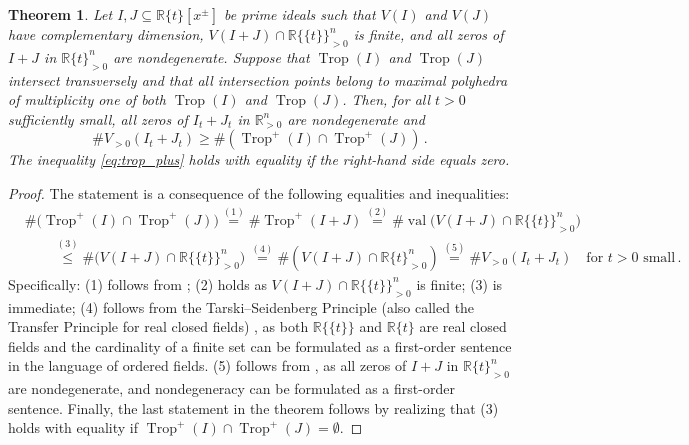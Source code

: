 \documentclass[11pt,reqno,a4paper]{amsart}
\numberwithin{equation}{section}
\theoremstyle{theoremstyle}
\newtheorem{theorem}{Theorem}[section]
\theoremstyle{examplestyle}
\newcommand{\RR}{\mathbb{R}}
\newcommand{\RRt}{\mathbb{R}\{\!\{t\}\!\}}
\DeclareMathOperator{\Trop}{Trop}
\DeclareMathOperator{\val}{val}
\begin{document}
\begin{theorem}
\label{thm:RealTropLowerBounds}
   Let $I,J \subseteq  \mathbb{R}\{t\}[x^\pm]$ be prime ideals such that $V(I)$ and $V(J)$ have complementary dimension, $V(I+J)\cap \RRt^n_{>0}$ is finite, and all zeros of $I+J$  in $\RR\{t\}^n_{>0}$ are nondegenerate. Suppose that $\Trop(I)$ and $\Trop(J)$ intersect transversely and that all intersection points belong to maximal polyhedra of multiplicity one of both $\Trop(I)$ and $\Trop(J)$. Then, for all $t>0$ sufficiently small,  all zeros of $I_t+ J_t$ in $\mathbb{R}^n_{>0}$ are nondegenerate and  
   \begin{equation}\label{eq:trop_plus}
   \#  V_{>0}(I_t+ J_t)  \geq \#\left(\Trop^+(I) \cap \Trop^+(J) \right)\,.
    \end{equation}
  The inequality \eqref{eq:trop_plus} holds with equality if the right-hand side equals zero.
\end{theorem}
\begin{proof}
The statement is a consequence of the following equalities and inequalities: 
\begin{align*} 
& \# \big(\Trop^+(I) \cap \Trop^+(J)\big)  \overset{(1)}{=} \#  \Trop^+(I+J) 
\overset{(2)}{=} \# \val\big( V(I+J) \cap \RRt^n_{>0}\big) \\ &\qquad  
\overset{(3)}{\leq}  \# \big(V(I+J) \cap \RRt^n_{>0}\big)\, %
 \overset{(4)}{=} \# ( V(I+J) \cap \mathbb{R}\{t\}^n_{>0}) %
 \overset{(5)}{=} \# V_{>0}(I_t+J_t) \quad \text{for $t>0$ small}\, . 
\end{align*}
 Specifically: (1) follows from \cite[Theorem~4.11]{RoseTelek24}; (2) holds as $V(I+J)\cap \RRt^n_{>0}$ is finite; (3) is immediate; (4) follows from the Tarski--Seidenberg Principle (also called the Transfer Principle for real closed fields) \cite[Theorem~2.80]{BasuPollackRoy}, as both $\RRt$ and $\RR\{t\}$ are real closed fields and the cardinality of a finite set can be formulated as a first-order sentence in the language of ordered fields. 
(5) follows from \cite[Proposition~3.17]{BasuPollackRoy}, as  all zeros  of  $I+J$ in $\mathbb{R}\{t\}^n_{>0}$ are nondegenerate, and  nondegeneracy can be formulated as a first-order sentence. 
Finally, the last statement in the theorem follows by realizing that (3) holds with equality if $\Trop^+(I) \cap \Trop^+(J)=\emptyset$.
\end{proof}
\end{document}
